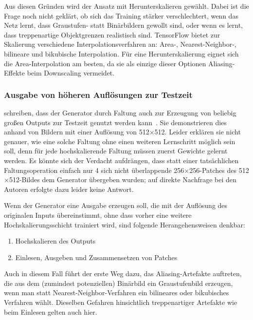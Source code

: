 Aus diesen Gründen wird der Ansatz mit Herunterskalieren gewählt.
Dabei ist die Frage noch nicht geklärt, ob sich das Training stärker verschlechtert, wenn das Netz lernt, dass Graustufen- statt Binärbildern gewollt sind, oder wenn es lernt, dass treppenartige Objektgrenzen realistisch sind.
TensorFlow bietet zur Skalierung verschiedene Interpolationsverfahren an: Area-, Nearest-Neighbor-, bilineare und bikubische Interpolation.
Für eine Herunterskalierung eignet sich die Area-Interpolation am besten, da sie als einzige dieser Optionen Aliasing-Effekte beim Downscaling vermeidet.



\subsubsection{Ausgabe von höheren Auflösungen zur Testzeit}

\citeauthor{Isola.2017} schreiben, dass der Generator durch Faltung auch zur Erzeugung von beliebig großen Outputs zur Testzeit genutzt werden kann~\cite{Isola.2017}.
Sie demonstrieren dies anhand von Bildern mit einer Auflösung von 512$\times$512.
Leider erklären sie nicht genauer, wie eine solche Faltung ohne einen weiteren Lernschritt möglich sein soll, denn für jede hochskalierende Faltung müssen zuerst Gewichte gelernt werden.
Es könnte sich der Verdacht aufdrängen, dass statt einer tatsächlichen Faltungsoperation einfach nur 4 sich nicht überlappende 256$\times$256-Patches des 512$\times$512-Bildes dem Generator übergeben wurden; auf direkte Nachfrage bei den Autoren erfolgte dazu leider keine Antwort.

Wenn der Generator eine Ausgabe erzeugen soll, die mit der Auflösung des originalen Inputs übereinstimmt, ohne dass vorher eine weitere Hochskalierungsschicht trainiert wird, sind folgende Herangehensweisen denkbar:

\begin{enumerate}
	\item Hochskalieren des Outputs
	\item Einlesen, Ausgeben und Zusammensetzen von Patches
\end{enumerate}

Auch in diesem Fall führt der erste Weg dazu, das Aliasing-Artefakte auftreten, die aus dem (zumindest potenziellen) Binärbild ein Graustufenbild erzeugen, wenn man statt Nearest-Neighbor-Verfahren ein bilineares oder bikubisches Verfahren wählt.
Dieselben Gefahren hinsichtlich treppenartiger Artefakte wie beim Einlesen gelten auch hier.

